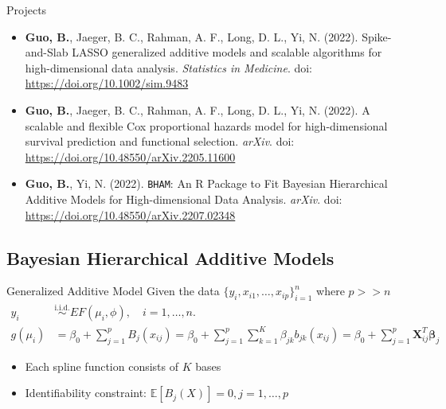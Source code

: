 \documentclass[
  ignorenonframetext,
  aspectratio=169]{beamer}
\providecommand{\tightlist}{%
  \setlength{\itemsep}{0pt}\setlength{\parskip}{0pt}}
\newcommand{\bs}[1]{\boldsymbol{#1}}
\begin{document}
\begin{frame}[fragile]{Projects}
\protect\hypertarget{projects}{}
\begin{itemize}
\item
  \textbf{Guo, B.}, Jaeger, B. C., Rahman, A. F., Long, D. L., Yi, N.
  (2022). Spike-and-Slab LASSO generalized additive models and scalable
  algorithms for high-dimensional data analysis. \emph{Statistics in
  Medicine}. doi: \url{https://doi.org/10.1002/sim.9483}
\item
  \textbf{Guo, B.}, Jaeger, B. C., Rahman, A. F., Long, D. L., Yi, N.
  (2022). A scalable and flexible Cox proportional hazards model for
  high-dimensional survival prediction and functional selection.
  \emph{arXiv}. doi: \url{https://doi.org/10.48550/arXiv.2205.11600}
\item
  \textbf{Guo, B.}, Yi, N. (2022). \texttt{BHAM}: An R Package to Fit
  Bayesian Hierarchical Additive Models for High-dimensional Data
  Analysis. \emph{arXiv}. doi:
  \url{ https://doi.org/10.48550/arXiv.2207.02348}
\end{itemize}
\end{frame}

\hypertarget{bayesian-hierarchical-additive-models}{%
\subsection{Bayesian Hierarchical Additive
Models}\label{bayesian-hierarchical-additive-models}}

\begin{frame}{Generalized Additive Model}
\protect\hypertarget{generalized-additive-model}{}
Given the data \(\{y_i, x_{i1}, \dots ,x_{ip}\}_{i=1}^n\) where
\(p >> n\) \begin{align*}
y_i &\overset{\text{i.i.d.}}{\sim} EF(\mu_i, \phi), \quad i = 1, \dots, n.\\
g(\mu_i) &= \beta_0 + \sum\limits^p_{j=1}B_j(x_{ij}) = \beta_0 + \sum\limits^p_{j=1}\sum\limits_{k=1}^K \beta_{jk}b_{jk}(x_{ij}) = \beta_0 + \sum\limits^p_{j=1}\bs X_{ij}^T \bs \beta_j
\end{align*}

\begin{itemize}
\tightlist
\item
  Each spline function consists of \(K\) bases
\item
  Identifiability constraint:
  \(\mathbb{E}\left[B_j(X)\right] = 0, j=1,\dots, p\)
\end{itemize}
\end{frame}
\end{document}

